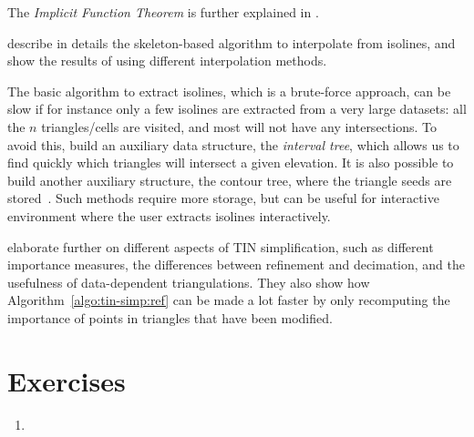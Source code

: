 The \emph{Implicit Function Theorem} is further explained in \citet{Sibson97}.

\citet{Dakowicz03} describe in details the skeleton-based algorithm to interpolate from isolines, and show the results of using different interpolation methods.

The basic algorithm to extract isolines, which is a brute-force approach, can be slow if for instance only a few isolines are extracted from a very large datasets: all the $n$ triangles/cells are visited, and most will not have any intersections.
To avoid this, \citet{vanKreveld96} build an auxiliary data structure, the \emph{interval tree}, which allows us to find quickly which triangles will intersect a given elevation.
It is also possible to build another auxiliary structure, the contour tree, where the triangle seeds are stored~\citep{vanKreveld97-1}.
Such methods require more storage, but can be useful for interactive environment where the user extracts isolines interactively.

\citet{Garland95} elaborate further on different aspects of TIN simplification, such as different importance measures, the differences between refinement and decimation, and the usefulness of data-dependent triangulations. 
They also show how Algorithm~\ref{algo:tin-simp:ref} can be made a lot faster by only recomputing the importance of points in triangles that have been modified. 


%
\section{Exercises}

\begin{enumerate}
  \item 
\end{enumerate}